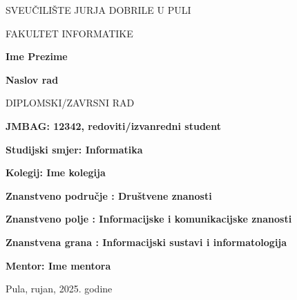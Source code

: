 \begin{center}
SVEUČILIŠTE JURJA DOBRILE U PULI 

FAKULTET INFORMATIKE

\vspace{45mm} 

\textbf{Ime Prezime}

\vspace{20mm} 

\textbf{Naslov rad}

\vspace{5mm}
DIPLOMSKI/ZAVRSNI RAD

\end{center}

\vspace{45mm}

\textbf{JMBAG: 12342, redoviti/izvanredni student}

\textbf{Studijski smjer: Informatika}
\bigskip

\textbf{Kolegij: Ime kolegija}

\textbf{Znanstveno područje : Društvene znanosti}

\textbf{Znanstveno polje : Informacijske i komunikacijske znanosti}

\textbf{Znanstvena grana : Informacijski sustavi i informatologija}
\bigskip

\textbf{Mentor: Ime mentora}

\vfill

\begin{center}

Pula, rujan, 2025. godine

\end{center}
